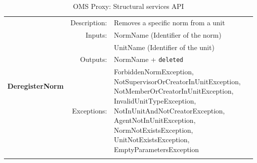 \begin{longtable}{|p{3cm}|r|p{8.5cm}|}
  \hline
  \multirow{5}{*}{\textbf{DeregisterNorm}} & Description: & Removes a specific norm from a unit \\ \cline{2-3}
    & Inputs: & NormName (Identifier of the norm) \\ \cline{3-3}
    &  & UnitName (Identifier of the unit) \\ \cline{2-3}
    & Outputs:     & NormName + \texttt{deleted} \\ \cline{2-3}
    & Exceptions:  & ForbiddenNormException, NotSupervisorOrCreatorInUnitException, NotMemberOrCreatorInUnitException, InvalidUnitTypeException, NotInUnitAndNotCreatorException, AgentNotInUnitException, NormNotExistsException, UnitNotExistsException, EmptyParametersException \\ \hline
\caption{OMS Proxy: Structural services API}
\label{tab:thomas_OMSProxy_registration}
\end{longtable}

